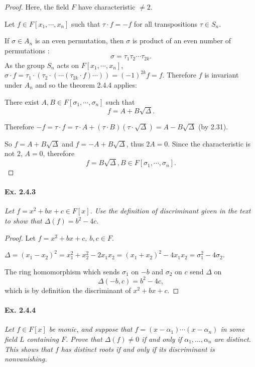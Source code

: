 \documentclass[11pt,a4paper]{article}
\begin{document}
\begin{proof}
 Here, the field $F$ have characteristic $\ne 2$.
 
Let $f\in F[x_1,\cdots,x_n]$  such that $\tau \cdot f = -f$ for all transpositions $\tau \in S_n$.
 
If $\sigma \in A_n$ is an even permutation, then $\sigma$ is product of an even number of permutations :
 $$\sigma = \tau_1 \tau_2\cdots \tau_{2k}.$$
As the group $S_n$ acts on $F[x_1,\cdots,x_n]$,  $\sigma \cdot f = \tau_1 \cdot ( \tau_2 \cdot ( \cdots (\tau_{2k} \cdot f)\cdots)) = (-1)^{2k} f = f$. Therefore $f$ is invariant under $A_n$ and so the theorem  2.4.4 applies:

There exist $A,B \in F[\sigma_1,\cdots,\sigma_n]$ such that
$$f = A+B\sqrt{\Delta}.$$

Therefore $-f = \tau \cdot f = \tau \cdot A + (\tau\cdot B)(\tau \cdot \sqrt{\Delta}) = A - B\sqrt{\Delta}$ (by 2.31).

So $f = A + B\sqrt{\Delta}$ and  $f = -A+B\sqrt{\Delta}$, thus $2A=0$. Since the characteristic is not 2, $A=0$, therefore
$$f = B\sqrt{\Delta}, B \in F[\sigma_1,\cdots,\sigma_n].$$
\end{proof}

\paragraph{Ex. 2.4.3}

{\it Let $f = x^2+bx+c \in F[x]$. Use the definition of discriminant given in the text to show that $\Delta(f) = b^2 - 4c$.
}

\begin{proof}
Let $f=x^2+bx+c, \ b,c \in F$.

$\Delta = (x_1-x_2)^2 = x_1^2+x_2^2-2x_1x_2 = (x_1+x_2)^2 -4 x_1x_2 = \sigma_1^2-4\sigma_2$.

The ring homomorphism which sends $\sigma_1$ on $-b$ and $\sigma_2$ on $c$ send $\Delta$ on
$$\Delta(-b,c) = b^2 -4c,$$
which is by definition the discriminant of $x^2+bx+c$.
\end{proof}

\paragraph{Ex. 2.4.4}

{\it Let $f \in F[x]$ be monic, and suppose that $f = (x-\alpha_1)\cdots(x-\alpha_n)$ in some field $L$ containing $F$. Prove that $\Delta(f) \ne 0$ if and only if $\alpha_1,\ldots,\alpha_n$ are distinct. This shows that $f$ has distinct roots if and only if its discriminant is nonvanishing.
}
\end{document}

